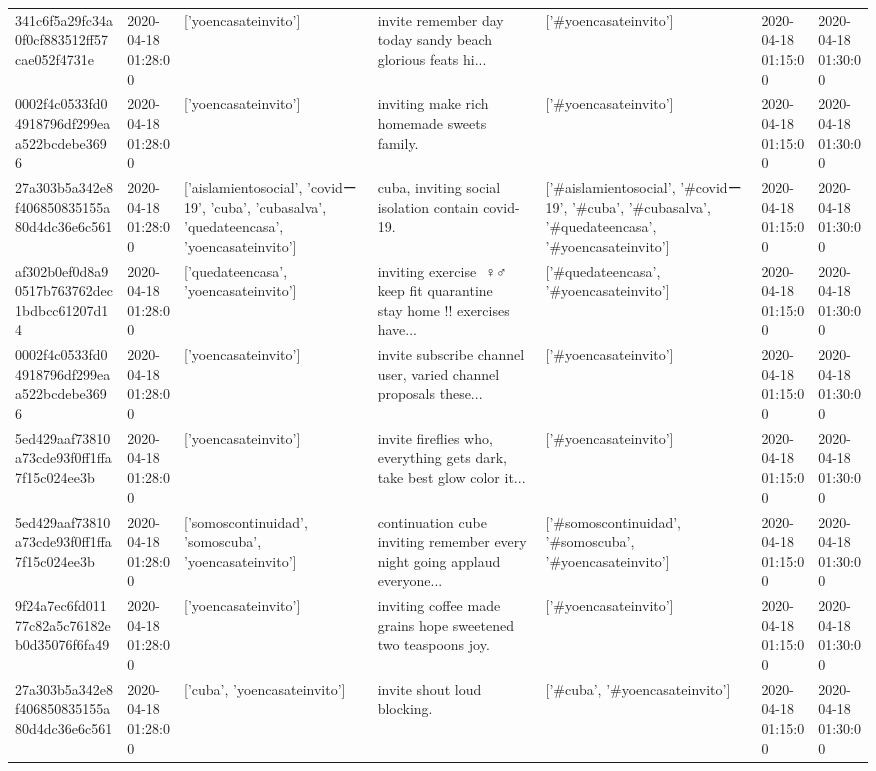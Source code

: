\begin{tabular}{lllllll}
341c6f5a29fc34a0f0cf883512ff57cae052f4731e & 2020-04-18 01:28:00 & ['yoencasateinvito'] & invite remember day today sandy beach glorious feats hi... & ['#yoencasateinvito'] & 2020-04-18 01:15:00 & 2020-04-18 01:30:00 \\
0002f4c0533fd04918796df299eaa522bcdebe3696 & 2020-04-18 01:28:00 & ['yoencasateinvito'] & inviting make rich homemade sweets family. & ['#yoencasateinvito'] & 2020-04-18 01:15:00 & 2020-04-18 01:30:00 \\
27a303b5a342e8f406850835155a80d4dc36e6c561 & 2020-04-18 01:28:00 & ['aislamientosocial', 'covidー19', 'cuba', 'cubasalva', 'quedateencasa', 'yoencasateinvito'] & cuba, inviting social isolation contain covid-19. & ['#aislamientosocial', '#covidー19', '#cuba', '#cubasalva', '#quedateencasa', '#yoencasateinvito'] & 2020-04-18 01:15:00 & 2020-04-18 01:30:00 \\
af302b0ef0d8a90517b763762dec1bdbcc61207d14 & 2020-04-18 01:28:00 & ['quedateencasa', 'yoencasateinvito'] & inviting exercise ️ ♀️♂️ keep fit quarantine 💪💪 stay home !!️ exercises have... & ['#quedateencasa', '#yoencasateinvito'] & 2020-04-18 01:15:00 & 2020-04-18 01:30:00 \\
0002f4c0533fd04918796df299eaa522bcdebe3696 & 2020-04-18 01:28:00 & ['yoencasateinvito'] & invite subscribe channel user, varied channel proposals these... & ['#yoencasateinvito'] & 2020-04-18 01:15:00 & 2020-04-18 01:30:00 \\
5ed429aaf73810a73cde93f0ff1ffa7f15c024ee3b & 2020-04-18 01:28:00 & ['yoencasateinvito'] & invite fireflies who, everything gets dark, take best glow color it... & ['#yoencasateinvito'] & 2020-04-18 01:15:00 & 2020-04-18 01:30:00 \\
5ed429aaf73810a73cde93f0ff1ffa7f15c024ee3b & 2020-04-18 01:28:00 & ['somoscontinuidad', 'somoscuba', 'yoencasateinvito'] & continuation cube inviting remember every night going applaud everyone... & ['#somoscontinuidad', '#somoscuba', '#yoencasateinvito'] & 2020-04-18 01:15:00 & 2020-04-18 01:30:00 \\
9f24a7ec6fd01177c82a5c76182eb0d35076f6fa49 & 2020-04-18 01:28:00 & ['yoencasateinvito'] & inviting coffee made grains hope sweetened two teaspoons joy. & ['#yoencasateinvito'] & 2020-04-18 01:15:00 & 2020-04-18 01:30:00 \\
27a303b5a342e8f406850835155a80d4dc36e6c561 & 2020-04-18 01:28:00 & ['cuba', 'yoencasateinvito'] & invite shout loud blocking. & ['#cuba', '#yoencasateinvito'] & 2020-04-18 01:15:00 & 2020-04-18 01:30:00 \\

\end{tabular}
